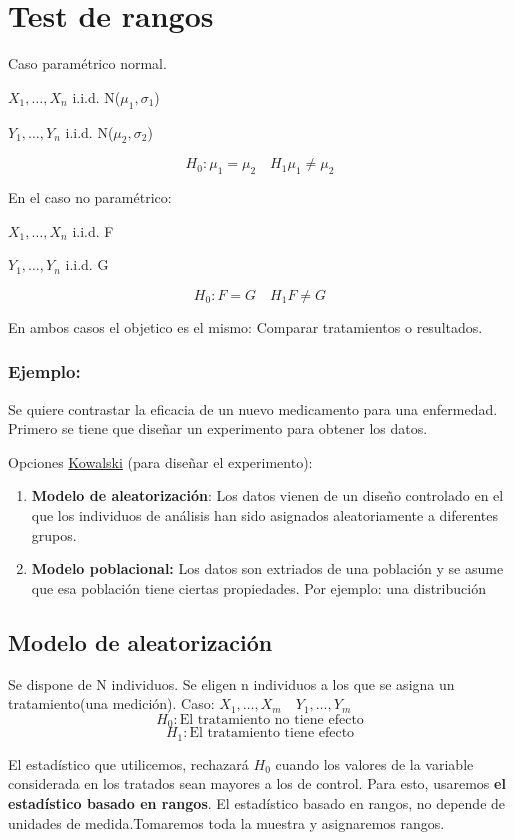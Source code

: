 \section{Test de rangos}

Caso paramétrico normal.

$X_1,\dots,X_n$ i.i.d. N($\mu_1,\sigma_1$)

$Y_1,\dots,Y_n$ i.i.d. N($\mu_2,\sigma_2$)

\[
H_0:\mu_1=\mu_2 \quad H_1 \mu_1 \neq \mu_2
\]

En el caso no paramétrico:

$X_1,\dots,X_n$ i.i.d. F

$Y_1,\dots,Y_n$ i.i.d. G

\[
H_0:F=G \quad H_1 F \neq G
\]

En ambos casos el objetico es el mismo: Comparar tratamientos o resultados.

\subsubsection*{Ejemplo:} 
Se quiere contrastar la eficacia de un nuevo medicamento para una enfermedad.
Primero se tiene que diseñar un experimento para obtener los datos.

Opciones \href{https://media.tenor.com/lsbTX_Avt2AAAAAM/brushing-teeth-kowalski.gif}{Kowalski} (para diseñar el experimento):
\begin{enumerate}
    \item \textbf{Modelo de aleatorización}: Los datos vienen de un diseño controlado en el que los 
    individuos de análisis han sido asignados aleatoriamente a diferentes grupos.
    \item \textbf{Modelo poblacional:} Los datos son extriados de una población y se asume que esa población tiene ciertas propiedades. 
    Por ejemplo: una distribución
\end{enumerate}

\subsection{Modelo de aleatorización}

Se dispone de N individuos. Se eligen n individuos a los que se asigna un tratamiento(una medición).
Caso:
\(
X_1,\dots,X_m \quad Y_1,\dots,Y_m
\)
\[
H_0: \text{El tratamiento no tiene efecto} 
\]
\[
H_1: \text{El tratamiento tiene efecto} 
\]

El estadístico que utilicemos, rechazará $H_0$ cuando los valores de la variable considerada en los tratados sean mayores a los de control.
Para esto, usaremos \textbf{el estadístico basado en rangos}.
El estadístico basado en rangos, no depende de unidades de medida.Tomaremos toda la muestra y asignaremos rangos.

